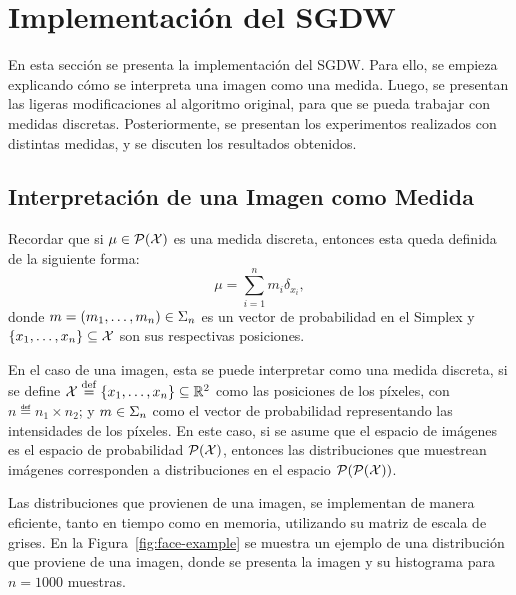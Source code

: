 
\section{Implementación del SGDW}\label{sec:sgdw}  %

En esta sección se presenta la implementación del SGDW. Para ello, se empieza explicando cómo se interpreta una imagen como una medida. Luego, se presentan las ligeras modificaciones al algoritmo original, para que se pueda trabajar con medidas discretas. Posteriormente, se presentan los experimentos realizados con distintas medidas, y se discuten los resultados obtenidos.

\subsection{Interpretación de una Imagen como Medida}\label{ssec:interpr-imagen-medida}  %

Recordar que si $\mu\in \ProbSpace[\cX] $ es una medida discreta, entonces esta queda definida de la siguiente forma:
\begin{equation}\label{eq:medida-discreta}
    \mu = \sum_{i=1}^{n} m_i \delta_{x_i},
\end{equation}
donde $m = (m_1, \dots, m_n) \in \Simplex[n]$ es un vector de probabilidad en el Simplex y $ \left\{ x_1, \dots, x_n \right\} \subseteq \cX $ son sus respectivas posiciones.

En el caso de una imagen, esta se puede interpretar como una medida discreta, si se define $\cX \eqdef \left\{ x_1, \dots, x_n \right\} \subseteq \R^2$ como las posiciones de los píxeles, con $n \eqdef n_1 \times n_2$; y $m \in \Simplex[n]$ como el vector de probabilidad representando las intensidades de los píxeles. En este caso, si se asume que el espacio de imágenes es el espacio de probabilidad $\ProbSpace[\cX] $, entonces las distribuciones que muestrean imágenes corresponden a distribuciones en el espacio $\ProbSpace[\ProbSpace[\cX] ] $.

Las distribuciones que provienen de una imagen, se implementan de manera eficiente, tanto en tiempo como en memoria, utilizando su matriz de escala de grises. En la Figura~\ref{fig:face-example} se muestra un ejemplo de una distribución que proviene de una imagen, donde se presenta la imagen y su histograma para $n=1000$ muestras.

